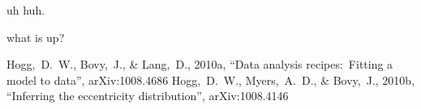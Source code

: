 \documentclass[12pt,twoside]{article}
\begin{document}
uh huh.

\begin{problem}
what is up?
\end{problem}

\clearpage
{}\theendnotes

\clearpage
\begin{thebibliography}{}\raggedright
{}
  Hogg,~D.~W., Bovy,~J., \& Lang,~D., 2010a,
  ``Data analysis recipes:\ Fitting a model to data'', arXiv:1008.4686
  Hogg,~D.~W., Myers,~A.~D., \& Bovy,~J., 2010b,
  ``Inferring the eccentricity distribution'', arXiv:1008.4146
\end{thebibliography}
\end{document}
